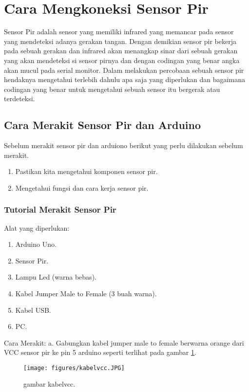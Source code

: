 \section{Cara Mengkoneksi Sensor Pir}

Sensor Pir adalah sensor yang memiliki infrared yang memancar pada sensor yang mendeteksi adanya gerakan tangan.
Dengan demikian sensor pir bekerja pada sebuah gerakan dan infrared akan menangkap sinar dari sebuah gerakan yang akan mendeteksi si sensor pirnya dan dengan codingan yang benar angka akan mucul pada serial monitor.
Dalam melakukan percobaan sebuah sensor pir hendaknya mengetahui terlebih dahulu apa saja yang diperlukan dan bagaimana codingan yang benar untuk mengetahui sebuah sensor itu bergerak atau terdeteksi.

\subsection {Cara Merakit Sensor Pir dan Arduino}

Sebelum merakit sensor pir dan arduiono berikut yang perlu dilakukan sebelum merakit.
\begin{enumerate}
\item Pastikan kita mengetahui komponen sensor pir.
\item Mengetahui fungsi dan cara kerja sensor pir.
\end{enumerate}

\subsubsection {Tutorial Merakit Sensor Pir}
Alat yang diperlukan:
\begin{enumerate}
\item Arduino Uno.
\item Sensor Pir.
\item Lampu Led (warna bebas).
\item Kabel Jumper Male to Female (3 buah warna).
\item Kabel USB.
\item PC.
\end{enumerate}

Cara Merakit:
a. Gabungkan kabel jumper male to female berwarna orange dari VCC sensor pir ke pin 5 arduino seperti terlihat pada gambar \ref{carakoneksikabelvcc}.



\begin{figure} [ht]
\centerline{\texttt{[image: figures/kabelvcc.JPG]}}
\caption{gambar kabelvcc.}
\label{carakoneksikabelvcc}
\end{figure}

